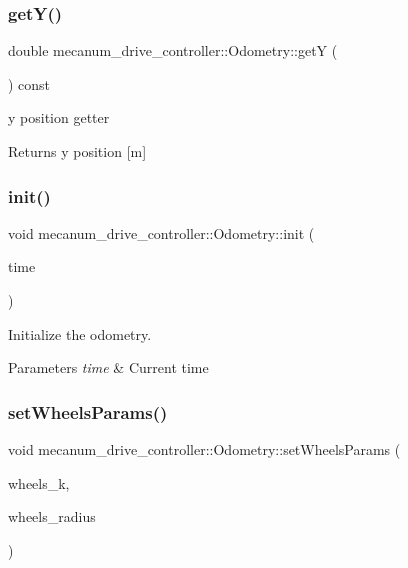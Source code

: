 \subsubsection{\texorpdfstring{get\+Y()}{getY()}}
{\footnotesize\ttfamily double mecanum\+\_\+drive\+\_\+controller\+::\+Odometry\+::getY (\begin{DoxyParamCaption}{ }\end{DoxyParamCaption}) const\hspace{0.3cm}{\ttfamily [inline]}}



y position getter 

\begin{DoxyReturn}{Returns}
y position \mbox{[}m\mbox{]} 
\end{DoxyReturn}
\mbox{\label{classmecanum__drive__controller_1_1Odometry_aab16ac85e777de56f586734fad0d3b54}} 
\subsubsection{\texorpdfstring{init()}{init()}}
{\footnotesize\ttfamily void mecanum\+\_\+drive\+\_\+controller\+::\+Odometry\+::init (\begin{DoxyParamCaption}\item[{const ros\+::\+Time \&}]{time }\end{DoxyParamCaption})}



Initialize the odometry. 


\begin{DoxyParams}{Parameters}
{\em time} & Current time \\
\hline
\end{DoxyParams}
\mbox{\label{classmecanum__drive__controller_1_1Odometry_aabd05f5d6caf20f0d2f7ba9406efe3e9}} 
\subsubsection{\texorpdfstring{set\+Wheels\+Params()}{setWheelsParams()}}
{\footnotesize\ttfamily void mecanum\+\_\+drive\+\_\+controller\+::\+Odometry\+::set\+Wheels\+Params (\begin{DoxyParamCaption}\item[{double}]{wheels\+\_\+k,  }\item[{double}]{wheels\+\_\+radius }\end{DoxyParamCaption})}



